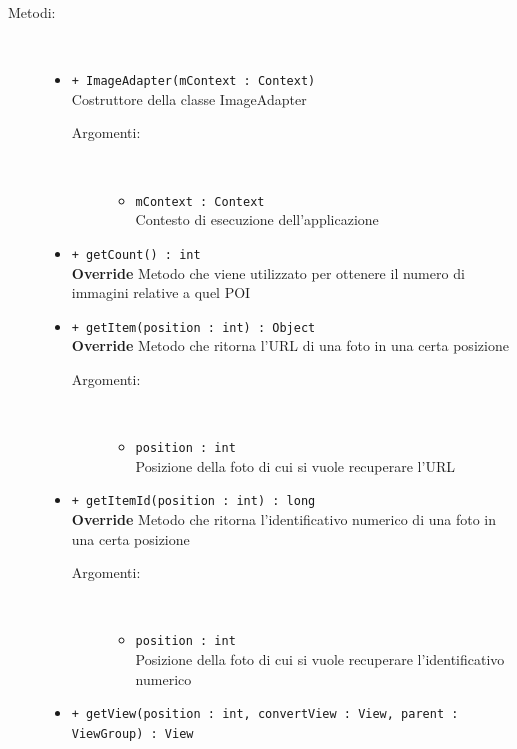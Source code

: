 \documentclass[../DefinizioneDiProdotto.tex]{subfiles}
\begin{document}
\begin{description}
\begin{itemize}
	\end{itemize}
	\item[Metodi:] \
	\begin{itemize}
		\item \texttt{+ ImageAdapter(mContext : Context)}\\
		Costruttore della classe ImageAdapter
		\begin{description}
			\item[Argomenti:] \
			\begin{itemize}
				\item \texttt{mContext : Context}\\
				Contesto di esecuzione dell'applicazione\end{itemize}
		\end{description}
		\item \texttt{+ getCount() : int}\\
		\textbf{Override} Metodo che viene utilizzato per ottenere il numero di immagini relative a quel POI
		\item \texttt{+ getItem(position : int) : Object}\\
		\textbf{Override} Metodo che ritorna l'URL di una foto in una certa posizione
		\begin{description}
			\item[Argomenti:] \
			\begin{itemize}
				\item \texttt{position : int}\\
				Posizione della foto di cui si vuole recuperare l'URL\end{itemize}
		\end{description}
		\item \texttt{+ getItemId(position  : int) : long}\\
		\textbf{Override} Metodo che ritorna l'identificativo numerico di una foto in una certa posizione
		\begin{description}
			\item[Argomenti:] \
			\begin{itemize}
				\item \texttt{position  : int}\\
				Posizione della foto di cui si vuole recuperare l'identificativo numerico\end{itemize}
		\end{description}
		\item \texttt{+ getView(position  : int, convertView : View, parent : ViewGroup) : View}\\

\end{itemize}
\end{description}
\end{document}
